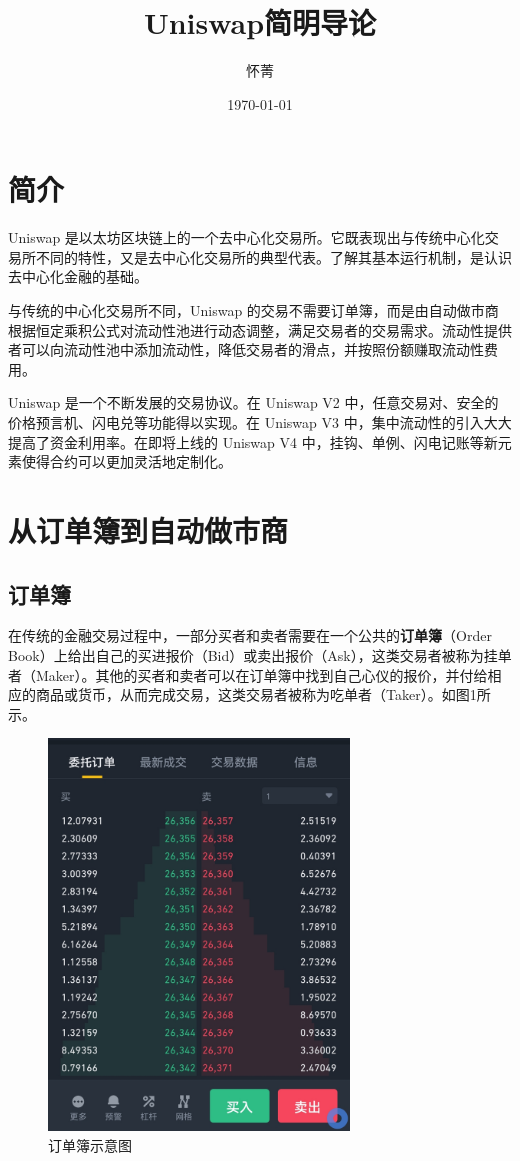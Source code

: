 \documentclass[12pt, a4paper, oneside]{ctexart}
\title{Uniswap简明导论}
\author{怀菁}
\date{\today}
\begin{document}
\maketitle

\section{简介}

Uniswap 是以太坊区块链上的一个去中心化交易所。它既表现出与传统中心化交易所不同的特性，又是去中心化交易所的典型代表。了解其基本运行机制，是认识去中心化金融的基础。

与传统的中心化交易所不同，Uniswap 的交易不需要订单簿，而是由自动做市商根据恒定乘积公式对流动性池进行动态调整，满足交易者的交易需求。流动性提供者可以向流动性池中添加流动性，降低交易者的滑点，并按照份额赚取流动性费用。

Uniswap 是一个不断发展的交易协议。在 Uniswap V2 中，任意交易对、安全的价格预言机、闪电兑等功能得以实现。在 Uniswap V3 中，集中流动性的引入大大提高了资金利用率。在即将上线的 Uniswap V4 中，挂钩、单例、闪电记账等新元素使得合约可以更加灵活地定制化。

\section{从订单簿到自动做市商}

\subsection{订单簿}

在传统的金融交易过程中，一部分买者和卖者需要在一个公共的\textbf{订单簿}（Order Book）上给出自己的买进报价（Bid）或卖出报价（Ask），这类交易者被称为挂单者（Maker）。其他的买者和卖者可以在订单簿中找到自己心仪的报价，并付给相应的商品或货币，从而完成交易，这类交易者被称为吃单者（Taker）。如图1所示。

\begin{figure}[htbp]
    \centering
    \includegraphics[width=8cm]{订单簿示意图.jpg}
    \caption{订单簿示意图}
\end{figure}
\end{document}
